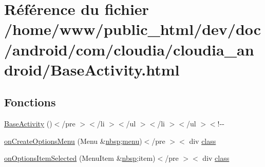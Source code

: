 \hypertarget{_base_activity_8html}{\section{Référence du fichier /home/www/public\-\_\-html/dev/doc/android/com/cloudia/cloudia\-\_\-android/\-Base\-Activity.html}
\label{_base_activity_8html}
}
\subsection*{Fonctions}
\begin{DoxyCompactItemize}
\item 
\hyperlink{_base_activity_8html_a72abf4a38d109047426bdd86e95837e3}{Base\-Activity} ()$<$/pre $>$$<$/li $>$$<$/ul $>$$<$/li $>$$<$/ul $>$$<$!-\/-\/
\item 
\hyperlink{_base_activity_8html_ad8d185357392942cfdc98d8a6f3e53d3}{on\-Create\-Options\-Menu} (Menu \&\hyperlink{_tools_8html_aef915316f784c9063d942974538301a6}{nbsp};\hyperlink{index-11_8html_a130970675bc563bd79bc2a7254add303}{menu})$<$/pre $>$$<$ div \hyperlink{_tools_8html_acf06f836132665ba8114f5a414c2403f}{class}
\item 
\hyperlink{_base_activity_8html_a3662070f23afc408422c0e2985e1812e}{on\-Options\-Item\-Selected} (Menu\-Item \&\hyperlink{_tools_8html_aef915316f784c9063d942974538301a6}{nbsp};item)$<$/pre $>$$<$ div \hyperlink{_tools_8html_acf06f836132665ba8114f5a414c2403f}{class}
\end{DoxyCompactItemize}
